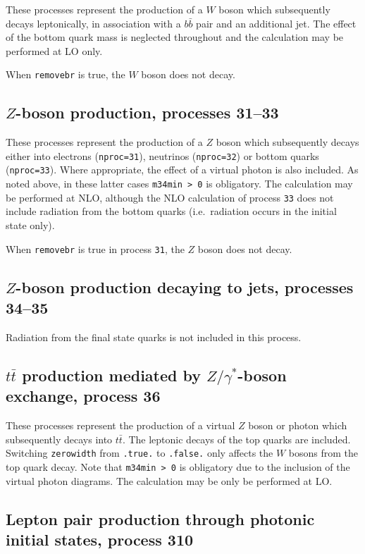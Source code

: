 \documentclass{article}
\begin{document}
These processes represent the production of a $W$ boson which subsequently
decays leptonically, in association with a $b{\bar b}$ pair and an
additional jet. The effect of the bottom quark mass is neglected throughout
and the calculation may be performed at LO only.

When {\tt removebr} is true, the $W$ boson does not decay.

\subsection{$Z$-boson production, processes 31--33}
\label{subsec:zboson}

These processes represent the production of a $Z$ boson which subsequently
decays either into electrons ({\tt nproc=31}), neutrinos ({\tt nproc=32})
or bottom quarks ({\tt nproc=33}). Where appropriate, the effect of a virtual
photon is also included. As noted above, in these latter cases {\tt m34min > 0}
is obligatory. The calculation may be performed at NLO,
although the NLO calculation of process {\tt 33} does not include radiation
from the bottom quarks (i.e.\ radiation occurs in the initial state only).

When {\tt removebr} is true in process {\tt 31}, the $Z$ boson does not decay.

\subsection{$Z$-boson production decaying to jets, processes 34--35}
Radiation from the final state quarks is not included in this process.

\subsection{$t \bar{t}$ production mediated by $Z/\gamma^*$-boson exchange, process 36}

These processes represent the production of a virtual $Z$ boson or photon 
which subsequently decays into $t \bar{t}$.
The leptonic decays of the top quarks are included.
Switching {\tt zerowidth} from {\tt .true.} to {\tt .false.} only affects
the $W$ bosons from the top quark decay.
Note that {\tt m34min > 0} is obligatory due to the inclusion of the
virtual photon diagrams. The calculation may be only be performed at LO.

\subsection{Lepton pair production through photonic initial states, process 310}
\label{subsec:gg2lep}
\end{document}
